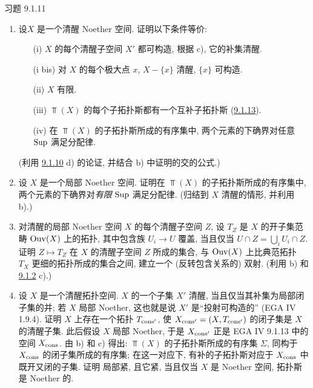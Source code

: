 \begin{enonce*}[remark]{习题 9.1.11}
\begin{enumerate}
证明: 若 $E'$ 和 $E''$ 是 $E$ 的两个子拓扑斯,
则它们互为弱补, 当且仅当它们互补
(\hyperref[IV.exer9.1.13]{9.1.13}).

\item 设\pageoriginale $X$ 是一个清醒 Noether 空间.
证明以下条件等价:
\begin{itemize}
\item[(i)] $X$ 的每个清醒子空间 $X'$ 都可构造,
\ie 根据 c), 它的补集清醒.

\item[(i bis)] 对 $X$ 的每个极大点 $x$,
$X-\{x\}$ 清醒, \ie $\{x\}$ 可构造.

\item[(ii)] $X$ 有限.

\item[(iii)] $\Top(X)$ 的每个子拓扑斯都有一个互补子拓扑斯
(\cf \hyperref[IV.exer9.1.13]{9.1.13}).

\item[(iv)] 在 $\Top(X)$ 的子拓扑斯所成的有序集中,
两个元素的下确界对任意 $\operatorname{Sup}$ 满足分配律.
\end{itemize}
(利用 \hyperref[IV.exer9.1.10]{9.1.10} d) 的论证,
并结合 b) 中证明的交的公式.)

\item 设 $X$ 是一个局部 Noether 空间.
证明在 $\Top(X)$ 的子拓扑斯所成的有序集中,
两个元素的下确界对\emph{有限} $\operatorname{Sup}$ 满足分配律.
(归结到 $X$ 清醒的情形, 并利用 b).)

\item 对清醒的局部 Noether 空间 $X$ 的每个清醒子空间 $Z$,
设 $T_Z$ 是 $X$ 的开子集范畴 $\operatorname{Ouv}(X)$ 上的拓扑,
其中包含族 $U_i\rightarrow U$ 覆盖,
当且仅当 $U\cap Z=\bigcup_i U_i\cap Z$.
证明 $Z\mapsto T_Z$ 在 $X$ 的清醒子空间 $Z$ 所成的集合,
与 $\operatorname{Ouv}(X)$ 上比典范拓扑 $T_X$ 更细的拓扑所成的集合之间,
建立一个 (反转包含关系的) 双射.
(利用 b) 和 \hyperref[IV.rem9.1.2]{9.1.2} c).)

\item 设 $X$ 是一个清醒拓扑空间.
$X$ 的一个子集 $X'$ 清醒, 当且仅当其补集为局部闭子集的并;
若 $X$ 局部 Noether, 这也就是说 $X'$ 是“投射可构造的” (EGA IV 1.9.4).
证明 $X$ 上存在一个拓扑 $T_{\operatorname{cons}'}$,
使 $X_{\operatorname{cons}'}=(X,T_{\operatorname{cons}'})$ 的闭子集是 $X$ 的清醒子集.
此后假设 $X$ 局部 Noether,
于是 $X_{\operatorname{cons}'}$ 正是 EGA IV 9.1.13 中的空间 $X_{\operatorname{cons}}$\pageoriginale.
由 b) 和 c) 得出: $\Top(X)$ 的子拓扑斯所成的有序集 $\Sigma$,
同构于 $X_{\operatorname{cons}}$ 的闭子集所成的有序集;
在这一对应下, 有补的子拓扑斯对应于 $X_{\operatorname{cons}}$ 中既开又闭的子集.
证明  局部紧,
且它紧, 当且仅当 $X$ 是 Noether 空间,
\ie 拓扑斯  是 Noether 的.


\end{enumerate}
\end{enonce*}
